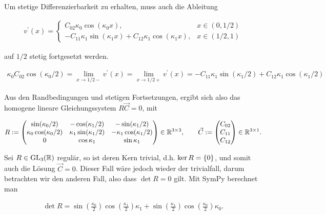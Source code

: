 Um stetige Differenzierbarkeit zu erhalten, muss auch die Ableitung

\begin{align*}
  v^\prime(x) =
  \begin{cases}
    C_{02} \kappa_0 \cos(\kappa_0 x),
    & x \in (0, 1/2) \\
    - C_{11} \kappa_1 \sin(\kappa_1 x) + C_{12} \kappa_1 \cos(\kappa_1 x),
    & x \in (1/2, 1)
  \end{cases}
\end{align*}

auf $1/2$ stetig fortgesetzt werden.

\begin{align*}
  \kappa_0 C_{02} \cos(\kappa_0/2)
  = \lim_{x \to 1/2-} v^\prime(x)
  = \lim_{x \to 1/2+} v^\prime(x)
  = - C_{11} \kappa_1 \sin(\kappa_1/2) + C_{12} \kappa_1 \cos(\kappa_1/2)
\end{align*}

Aus den Randbedingungen und stetigen Fortsetzungen, ergibt sich also das homogene lineare Gleichungssystem $R \vec C = 0$, mit

\begin{align*}
  R :=
  \begin{pmatrix}
    \sin(\kappa_0/2)          & -\cos(\kappa_1/2)         & -\sin(\kappa_1/2) \\
    \kappa_0 \cos(\kappa_0/2) & \kappa_1 \sin(\kappa_1/2) & - \kappa_1 \cos(\kappa_1/2) \\
    0                         & \cos{\kappa_1}            & \sin{\kappa_1}
  \end{pmatrix}
  \in \R^{3 \times 3}, \qquad
  \vec C :=
  \begin{pmatrix}
    C_{02} \\
    C_{11} \\
    C_{12}
  \end{pmatrix}
  \in \R^{3 \times 1}.
\end{align*}

Sei $R \in \GL[3]{\R}$ regulär, so ist deren Kern trivial, d.h. $\ker{R} = \Bbraces{0}$, und somit auch die Lösung $\vec C = 0$.
Dieser Fall wäre jedoch wieder der trivialfall, darum betrachten wir den anderen Fall,
also dass $\det{R} = 0$ gilt. Mit SymPy berechnet man

\begin{align*}
  \det{R} =
  \sin{\left(\frac{{\kappa}_{0}}{2} \right)} \cos{\left(\frac{{\kappa}_{1}}{2} \right)} {\kappa}_{1} + \sin{\left(\frac{{\kappa}_{1}}{2} \right)} \cos{\left(\frac{{\kappa}_{0}}{2} \right)} {\kappa}_{0}.
\end{align*}

